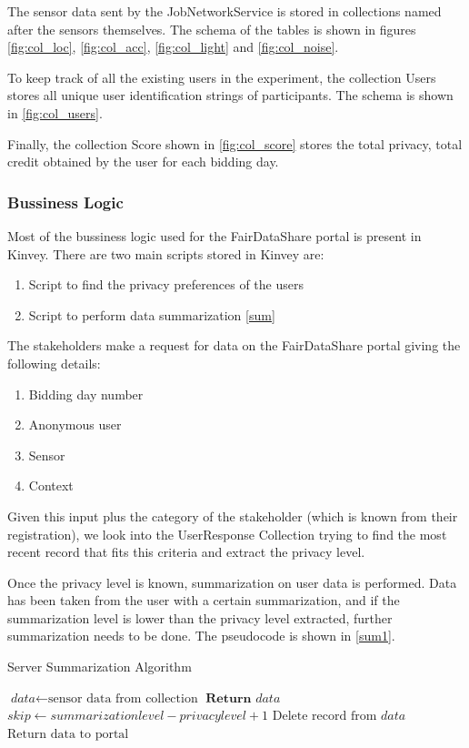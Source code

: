 The sensor data sent by the JobNetworkService is stored in collections named after the sensors themselves. The schema of the tables
is shown in figures \ref{fig:col_loc}, \ref{fig:col_acc}, \ref{fig:col_light} and \ref{fig:col_noise}.

To keep track of all the existing users in the experiment, the collection Users stores all unique user identification strings of participants.
The schema is shown in \ref{fig:col_users}.

Finally, the collection Score shown in \ref{fig:col_score} stores the total privacy, total credit obtained by the user for each bidding day.

\subsubsection{Bussiness Logic} \label{bl}
Most of the bussiness logic used for the FairDataShare portal is present in Kinvey. There are two main scripts stored in Kinvey are:

\begin{enumerate}
    \item Script to find the privacy preferences of the users
    \item Script to perform data summarization \ref{sum}
\end{enumerate}

The stakeholders make a request for data on the FairDataShare portal giving the following details:

\begin{enumerate}
    \item Bidding day number
    \item Anonymous user
    \item Sensor
    \item Context
\end{enumerate}

Given this input plus the category of the stakeholder (which is known from their registration), we look into the UserResponse Collection trying to find the most recent record that
fits this criteria and extract the privacy level.

Once the privacy level is known, summarization on user data is performed. Data has been taken from the user with a certain summarization, and if the summarization level is lower than the privacy level extracted, further summarization needs to be done. The pseudocode is shown in \ref{sum1}.

\begin{algorithm}
\caption{Server Summarization Algorithm}\label{sum1}
\begin{algorithmic}[1]
\State $\textit{data} \gets \text{sensor data from collection}$
	\State $\textbf{Return }\textit{data}$
\Else
	\State $\textit{skip} \gets \textit{summarizationlevel}-\textit{privacylevel}+1$
 	 \State $\text{Delete record from}\textit{ data}$
 	 \EndFor
\EndIf
\State $\text{Return data to portal}$
\EndProcedure
\end{algorithmic}
\end{algorithm}

